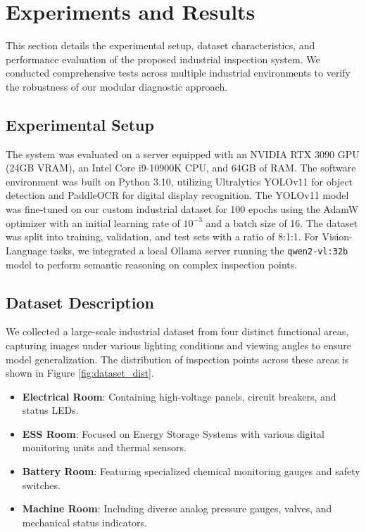 \section{Experiments and Results}
\label{sec:experiments}

This section details the experimental setup, dataset characteristics, and performance evaluation of the proposed industrial inspection system. We conducted comprehensive tests across multiple industrial environments to verify the robustness of our modular diagnostic approach.

\subsection{Experimental Setup}
The system was evaluated on a server equipped with an NVIDIA RTX 3090 GPU (24GB VRAM), an Intel Core i9-10900K CPU, and 64GB of RAM. The software environment was built on Python 3.10, utilizing Ultralytics YOLOv11 for object detection and PaddleOCR for digital display recognition. The YOLOv11 model was fine-tuned on our custom industrial dataset for 100 epochs using the AdamW optimizer with an initial learning rate of $10^{-3}$ and a batch size of 16. The dataset was split into training, validation, and test sets with a ratio of 8:1:1. For Vision-Language tasks, we integrated a local Ollama server running the \texttt{qwen2-vl:32b} model to perform semantic reasoning on complex inspection points.

\subsection{Dataset Description}
We collected a large-scale industrial dataset from four distinct functional areas, capturing images under various lighting conditions and viewing angles to ensure model generalization. The distribution of inspection points across these areas is shown in Figure \ref{fig:dataset_dist}.
\begin{itemize}
    \item \textbf{Electrical Room}: Containing high-voltage panels, circuit breakers, and status LEDs.
    \item \textbf{ESS Room}: Focused on Energy Storage Systems with various digital monitoring units and thermal sensors.
    \item \textbf{Battery Room}: Featuring specialized chemical monitoring gauges and safety switches.
    \item \textbf{Machine Room}: Including diverse analog pressure gauges, valves, and mechanical status indicators.
\end{itemize}

